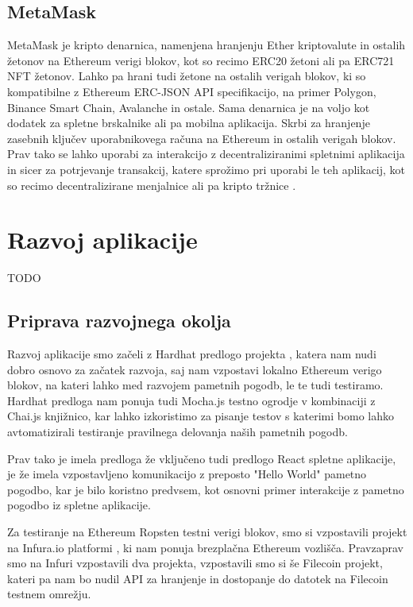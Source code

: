 \documentclass[a4paper,12pt,openright]{book}
\begin{document}
\section{MetaMask}
MetaMask je kripto denarnica, namenjena hranjenju Ether kriptovalute in ostalih žetonov na Ethereum verigi blokov, kot so recimo ERC20 žetoni ali pa ERC721 NFT žetonov.
Lahko pa hrani tudi žetone na ostalih verigah blokov, ki so kompatibilne z Ethereum ERC-JSON API specifikacijo, na primer Polygon, Binance Smart Chain, Avalanche in ostale.
Sama denarnica je na voljo kot dodatek za spletne brskalnike ali pa mobilna aplikacija.
Skrbi za hranjenje zasebnih ključev uporabnikovega računa na Ethereum in ostalih verigah blokov.
Prav tako se lahko uporabi za interakcijo z decentraliziranimi spletnimi aplikacija in sicer za potrjevanje transakcij, katere sprožimo pri uporabi le teh aplikacij, kot so recimo decentralizirane menjalnice ali pa kripto tržnice \cite{metamask}.


\chapter{Razvoj aplikacije}
TODO

\section{Priprava razvojnega okolja}
Razvoj aplikacije smo začeli z Hardhat predlogo projekta \cite{hardhat_react_boilerplate}, katera nam nudi dobro osnovo
za začatek razvoja, saj nam vzpostavi lokalno Ethereum verigo blokov, na kateri lahko med razvojem pametnih pogodb,
le te tudi testiramo.
Hardhat predloga nam ponuja tudi Mocha.js testno ogrodje v kombinaciji z Chai.js knjižnico, kar lahko izkoristimo 
za pisanje testov s katerimi bomo lahko avtomatizirali testiranje pravilnega delovanja naših pametnih pogodb.

Prav tako je imela predloga že vključeno tudi predlogo React spletne aplikacije, je že imela vzpostavljeno komunikacijo z 
preposto "Hello World" pametno pogodbo, kar je bilo koristno predvsem, kot osnovni primer interakcije z pametno pogodbo
iz spletne aplikacije.

Za testiranje na Ethereum Ropsten testni verigi blokov, smo si vzpostavili projekt na Infura.io platformi \cite{infura}, ki nam 
ponuja brezplačna Ethereum vozlišča. Pravzaprav smo na Infuri vzpostavili dva projekta, vzpostavili smo si še Filecoin projekt,
kateri pa nam bo nudil API za hranjenje in dostopanje do datotek na Filecoin testnem omrežju.
\end{document}
